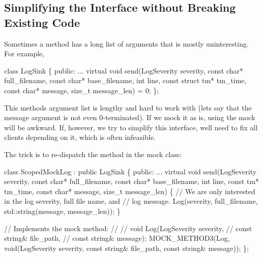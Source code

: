 \subsection*{Simplifying the Interface without Breaking Existing Code}

Sometimes a method has a long list of arguments that is mostly uninteresting. For example,


\begin{DoxyCode}
\textcolor{keyword}{class }LogSink \{
 \textcolor{keyword}{public}:
  ...
  \textcolor{keyword}{virtual} \textcolor{keywordtype}{void} send(LogSeverity severity, \textcolor{keyword}{const} \textcolor{keywordtype}{char}* full\_filename,
                    \textcolor{keyword}{const} \textcolor{keywordtype}{char}* base\_filename, \textcolor{keywordtype}{int} line,
                    \textcolor{keyword}{const} \textcolor{keyword}{struct} tm* tm\_time,
                    \textcolor{keyword}{const} \textcolor{keywordtype}{char}* message, \textcolor{keywordtype}{size\_t} message\_len) = 0;
\};
\end{DoxyCode}


This method\textquotesingle{}s argument list is lengthy and hard to work with (let\textquotesingle{}s say that the {\ttfamily message} argument is not even 0-\/terminated). If we mock it as is, using the mock will be awkward. If, however, we try to simplify this interface, we\textquotesingle{}ll need to fix all clients depending on it, which is often infeasible.

The trick is to re-\/dispatch the method in the mock class\+:


\begin{DoxyCode}
\textcolor{keyword}{class }ScopedMockLog : \textcolor{keyword}{public} LogSink \{
 \textcolor{keyword}{public}:
  ...
  \textcolor{keyword}{virtual} \textcolor{keywordtype}{void} send(LogSeverity severity, \textcolor{keyword}{const} \textcolor{keywordtype}{char}* full\_filename,
                    \textcolor{keyword}{const} \textcolor{keywordtype}{char}* base\_filename, \textcolor{keywordtype}{int} line, \textcolor{keyword}{const} tm* tm\_time,
                    \textcolor{keyword}{const} \textcolor{keywordtype}{char}* message, \textcolor{keywordtype}{size\_t} message\_len) \{
    \textcolor{comment}{// We are only interested in the log severity, full file name, and}
    \textcolor{comment}{// log message.}
    Log(severity, full\_filename, std::string(message, message\_len));
  \}

  \textcolor{comment}{// Implements the mock method:}
  \textcolor{comment}{//}
  \textcolor{comment}{//   void Log(LogSeverity severity,}
  \textcolor{comment}{//            const string& file\_path,}
  \textcolor{comment}{//            const string& message);}
  MOCK\_METHOD3(Log, \textcolor{keywordtype}{void}(LogSeverity severity, \textcolor{keyword}{const} \textcolor{keywordtype}{string}& file\_path,
                         \textcolor{keyword}{const} \textcolor{keywordtype}{string}& message));
\};
\end{DoxyCode}


